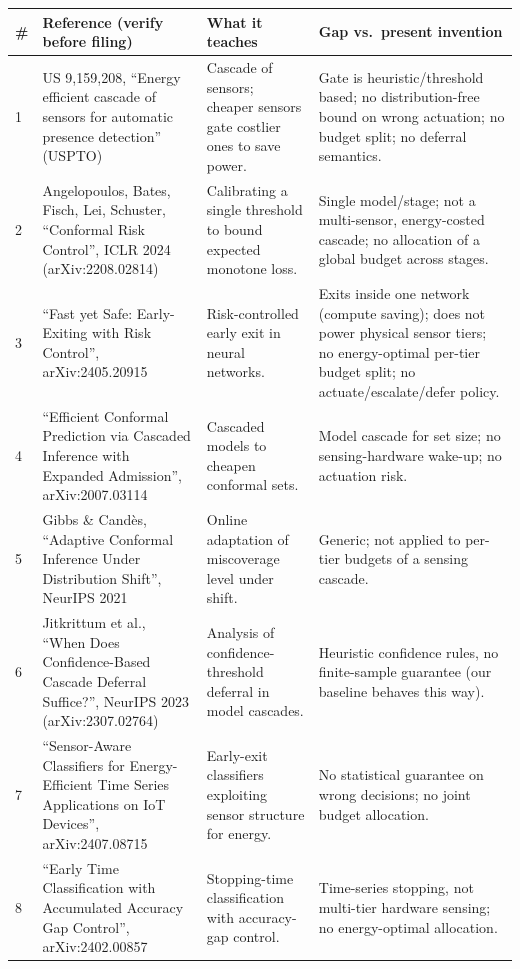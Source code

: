 \documentclass[10pt,a4paper]{article}
\newcommand{\sect}[1]{\par\vspace{5pt}{\bfseries\large #1}\par\vspace{1pt}}
\begin{document}
\sect{3. Prior patents and publications from literature}
\footnotesize
\begin{longtable}{@{}L{0.6cm}L{4.6cm}L{4.2cm}L{7.6cm}@{}}
\toprule \textbf{\#} & \textbf{Reference (verify before filing)} & \textbf{What it teaches} & \textbf{Gap vs.\ present invention}\\ \midrule {} & US 9,159,208, ``Energy efficient cascade of sensors for automatic presence detection'' (USPTO) & Cascade of sensors; cheaper sensors gate costlier ones to save power. & Gate is heuristic/threshold based; no distribution-free bound on wrong actuation; no budget split; no deferral semantics.\\
2 & Angelopoulos, Bates, Fisch, Lei, Schuster, ``Conformal Risk Control'', ICLR 2024 (arXiv:2208.02814) & Calibrating a single threshold to bound expected monotone loss. & Single model/stage; not a multi-sensor, energy-costed cascade; no allocation of a global budget across stages.\\
3 & ``Fast yet Safe: Early-Exiting with Risk Control'', arXiv:2405.20915 & Risk-controlled early exit in neural networks. & Exits inside one network (compute saving); does not power physical sensor tiers; no energy-optimal per-tier budget split; no actuate/escalate/defer policy.\\
4 & ``Efficient Conformal Prediction via Cascaded Inference with Expanded Admission'', arXiv:2007.03114 & Cascaded models to cheapen conformal sets. & Model cascade for set size; no sensing-hardware wake-up; no actuation risk.\\
5 & Gibbs \& Cand\`es, ``Adaptive Conformal Inference Under Distribution Shift'', NeurIPS 2021 & Online adaptation of miscoverage level under shift. & Generic; not applied to per-tier budgets of a sensing cascade.\\
6 & Jitkrittum et al., ``When Does Confidence-Based Cascade Deferral Suffice?'', NeurIPS 2023 (arXiv:2307.02764) & Analysis of confidence-threshold deferral in model cascades. & Heuristic confidence rules, no finite-sample guarantee (our baseline behaves this way).\\
7 & ``Sensor-Aware Classifiers for Energy-Efficient Time Series Applications on IoT Devices'', arXiv:2407.08715 & Early-exit classifiers exploiting sensor structure for energy. & No statistical guarantee on wrong decisions; no joint budget allocation.\\
8 & ``Early Time Classification with Accumulated Accuracy Gap Control'', arXiv:2402.00857 & Stopping-time classification with accuracy-gap control. & Time-series stopping, not multi-tier hardware sensing; no energy-optimal allocation.\\
\bottomrule
\end{longtable}
\vspace{-6pt}{\scriptsize Note: a professional patent-database search (Espacenet, Google Patents, InPASS; CPC G06N~20/00, G16Y, H04W~52/02, G05B~13) must confirm this table before filing. References 1--8 were identified by web search on 30-Sep-2026; only titles/abstract-level content was reviewed.}
\normalsize
\end{document}
